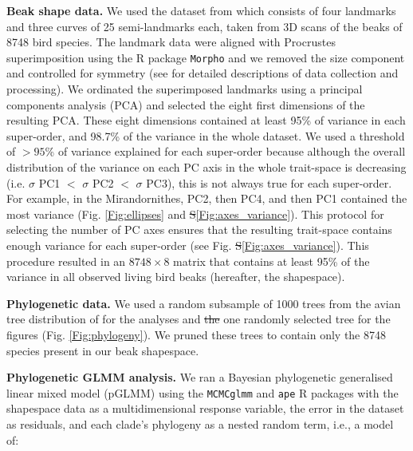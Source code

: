 \documentclass[12pt,letterpaper]{article}
\providecommand{\DIFaddtex}[1]{{\protect\color{blue}\uwave{#1}}} %
\providecommand{\DIFdeltex}[1]{{\protect\color{red}\sout{#1}}}                      %
\providecommand{\DIFaddbegin}{} %
\providecommand{\DIFaddend}{} %
\providecommand{\DIFdelbegin}{} %
\providecommand{\DIFdelend}{} %
\providecommand{\DIFadd}[1]{\texorpdfstring{\DIFaddtex{#1}}{#1}} %
\providecommand{\DIFdel}[1]{\texorpdfstring{\DIFdeltex{#1}}{}} %
\newcommand{\DIFscaledelfig}{0.5}
\newlength{\DIFdelgraphicswidth} %
\newlength{\DIFdelgraphicsheight} %
\newcommand{\DIFaddincludegraphics}[2][]{{\color{blue}\fbox{\DIFOincludegraphics[#1]{#2}}}} %
\newcommand{\DIFdelincludegraphics}[2][]{%
\sbox{\DIFdelgraphicsbox}{\DIFOincludegraphics[#1]{#2}}%
\settoboxwidth{\DIFdelgraphicswidth}{\DIFdelgraphicsbox} %
\settoboxtotalheight{\DIFdelgraphicsheight}{\DIFdelgraphicsbox} %
\scalebox{\DIFscaledelfig}{%
\parbox[b]{\DIFdelgraphicswidth}{\usebox{\DIFdelgraphicsbox}\\[-\baselineskip] \rule{\DIFdelgraphicswidth}{0em}}\llap{\resizebox{\DIFdelgraphicswidth}{\DIFdelgraphicsheight}{%
\setlength{\unitlength}{\DIFdelgraphicswidth}%
\begin{picture}(1,1)%
\thicklines\linethickness{2pt} %
{\color[rgb]{1,0,0}\put(0,0){\framebox(1,1){}}}%
{\color[rgb]{1,0,0}\put(0,0){\line( 1,1){1}}}%
{\color[rgb]{1,0,0}\put(0,1){\line(1,-1){1}}}%
\end{picture}%
}\hspace*{3pt}}} %
} %
\DeclareRobustCommand{\DIFaddbegin}{\DIFOaddbegin \let\includegraphics\DIFaddincludegraphics} %
\DeclareRobustCommand{\DIFaddend}{\DIFOaddend \let\includegraphics\DIFOincludegraphics} %
\DeclareRobustCommand{\DIFdelbegin}{\DIFOdelbegin \let\includegraphics\DIFdelincludegraphics} %
\DeclareRobustCommand{\DIFdelend}{\DIFOaddend \let\includegraphics\DIFOincludegraphics} %
\begin{document}
\textbf{Beak shape data.} We used the dataset from \cite{cooney2017mega,hughes2022global,chira2020signature} which consists of four landmarks and three curves of 25 semi-landmarks each, taken from 3D scans of the beaks of 8748 bird species.
The landmark data were aligned with Procrustes superimposition using the R package \texttt{Morpho} \cite{Rcore,Morpho} and we removed the size component and controlled for symmetry (see \cite{cooney2017mega,hughes2022global,chira2020signature} for detailed descriptions of data collection and processing).
We ordinated the superimposed landmarks using a principal components analysis (PCA) and selected the eight first dimensions of the resulting PCA.
These eight dimensions contained at least 95\% of variance in each super-order, and 98.7\% of the variance in the whole dataset.
We used a threshold of \DIFdelbegin \DIFdel{$>95$}\DIFdelend \DIFaddbegin \DIFadd{at least 95}\DIFaddend \% of variance explained for each super-order because although the overall distribution of the variance on each PC axis in the whole trait-space is decreasing (i.e. $\sigma$ PC1 \DIFdelbegin \DIFdel{$<$ }\DIFdelend \DIFaddbegin \DIFadd{$>$ }\DIFaddend $\sigma$ PC2 \DIFdelbegin \DIFdel{$<$ }\DIFdelend \DIFaddbegin \DIFadd{$>$ }\DIFaddend $\sigma$ PC3), this is not always true for each super-order.
For example, in the Mirandornithes, PC2, then PC4, and then PC1 contained the most variance (Fig.
\ref{Fig:ellipses} and \DIFdelbegin \DIFdel{S}\DIFdelend \ref{Fig:axes_variance}).
This protocol for selecting the number of PC axes ensures that the resulting trait-space contains enough variance for each super-order (see Fig. \DIFdelbegin \DIFdel{S}\DIFdelend \ref{Fig:axes_variance}).
This procedure resulted in an $8748 \times 8$ matrix that contains at least 95\% of the variance in all observed living bird beaks (hereafter, the shapespace). %

\textbf{Phylogenetic data.} We used a random subsample of 1000 trees from the avian tree distribution of \cite{jetz2012global} for the analyses and \DIFdelbegin \DIFdel{the }\DIFdelend one randomly selected tree for the figures (Fig. \ref{Fig:phylogeny}).
We pruned these trees to contain only the 8748 species present in our beak shapespace.

\textbf{Phylogenetic GLMM analysis.} We ran a Bayesian phylogenetic generalised linear mixed model (pGLMM) using the \texttt{MCMCglmm} and \texttt{ape} R packages \cite{MCMCglmm, ape} with the shapespace data as a multidimensional response variable, the error in the dataset as residuals, and each clade's phylogeny as a nested random term, i.e., a model of:
\end{document}

